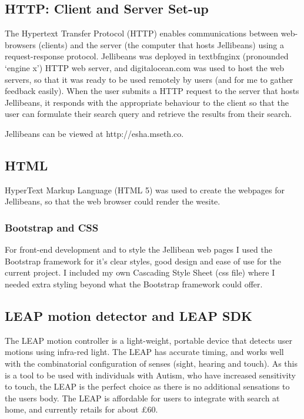 \documentclass[a4paper, 11pt]{article}
\begin{document}
\subsection{HTTP: Client and Server Set-up}
The Hypertext Transfer Protocol (HTTP) enables communications between web-browsers (clients) and the server (the computer that hosts Jellibeans) using a request-response protocol. Jellibeans was deployed in textbf{nginx} (pronounded `engine x') HTTP web server, and digitalocean.com was used to host the web servers, so that it was ready to be used remotely by users (and for me to gather feedback easily). When the user submits a HTTP request to the server that hosts Jellibeans, it responds with the appropriate behaviour to the client so that the user can formulate their search query and retrieve the results from their search. 

\vspace{5mm}
Jellibeans can be viewed at http://esha.mseth.co.

\subsection{HTML}
HyperText Markup Language (HTML 5) was used to create the webpages for Jellibeans, so that the web browser could render the wesite.


\subsubsection{Bootstrap and CSS}\label{boostrap}
For front-end development and to style the Jellibean web pages I used the Bootstrap framework \cite{bootstrap} for it's clear styles, good design and ease of use for the current project. I included my own Cascading Style Sheet (css file) where I needed extra styling beyond what the Bootstrap framework could offer. 


\subsection{LEAP motion detector and LEAP SDK}
The LEAP motion controller is a light-weight, portable device that detects user motions using infra-red light. The LEAP has accurate timing, and works well with the combinatorial configuration of senses (sight, hearing and touch). As this is a tool to be used with individuals with Autism, who have increased sensitivity to touch, the LEAP is the perfect choice as there is no additional sensations to the users body. The LEAP is affordable for users to integrate with search at home, and currently retails for about \pounds60.
\end{document}
